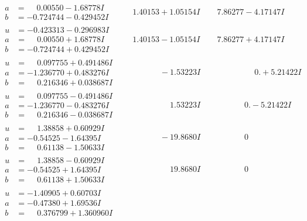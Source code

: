 \documentclass[1p]{elsarticle_modified}
\theoremstyle{definition}
\begin{document}
$$\begin{array}{c|c|c}
\begin{aligned}
a &= \phantom{-}0.00550 - 1.68778 I \\
b &= -0.724744 - 0.429452 I\end{aligned}
 & \phantom{-}1.40153 + 1.05154 I & \phantom{-}7.86277 - 4.17147 I \\ \hline\begin{aligned}
u &= -0.423313 - 0.296983 I \\
a &= \phantom{-}0.00550 + 1.68778 I \\
b &= -0.724744 + 0.429452 I\end{aligned}
 & \phantom{-}1.40153 - 1.05154 I & \phantom{-}7.86277 + 4.17147 I \\ \hline\begin{aligned}
u &= \phantom{-}0.097755 + 0.491486 I \\
a &= -1.236770 + 0.483276 I \\
b &= \phantom{-}0.216346 + 0.038687 I\end{aligned}
 & \phantom{-0.000000 } -1.53223 I & \phantom{-0.000000 -}0. + 5.21422 I \\ \hline\begin{aligned}
u &= \phantom{-}0.097755 - 0.491486 I \\
a &= -1.236770 - 0.483276 I \\
b &= \phantom{-}0.216346 - 0.038687 I\end{aligned}
 & \phantom{-0.000000 -}1.53223 I & \phantom{-0.000000 } 0. - 5.21422 I \\ \hline\begin{aligned}
u &= \phantom{-}1.38858 + 0.60929 I \\
a &= -0.54525 - 1.64395 I \\
b &= \phantom{-}0.61138 - 1.50633 I\end{aligned}
 & \phantom{-0.000000 } -19.8680 I & \phantom{-0.000000 } 0 \\ \hline\begin{aligned}
u &= \phantom{-}1.38858 - 0.60929 I \\
a &= -0.54525 + 1.64395 I \\
b &= \phantom{-}0.61138 + 1.50633 I\end{aligned}
 & \phantom{-0.000000 -}19.8680 I & \phantom{-0.000000 } 0 \\ \hline\begin{aligned}
u &= -1.40905 + 0.60703 I \\
a &= -0.47380 + 1.69536 I \\
b &= \phantom{-}0.376799 + 1.360960 I\end{aligned}

\end{array}$$
\end{document}
